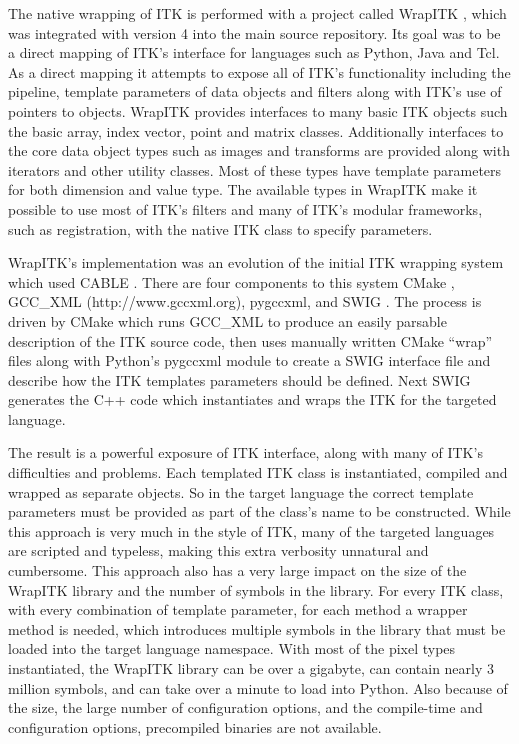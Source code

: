 \documentclass{frontiersMED} %
\begin{document}
The native wrapping of ITK is performed with a project called WrapITK
\cite{Lehmann2006}, which was integrated with version 4 into the main source
repository. Its goal was to be a direct mapping of ITK's interface for
languages such as Python, Java and Tcl. As a direct mapping it
attempts to expose all of ITK's functionality including the pipeline,
template parameters of data objects and filters along with ITK's use
of pointers to objects. WrapITK provides interfaces to many basic ITK
objects such the basic array, index vector, point and matrix
classes. Additionally interfaces to the core data object types such as
images and transforms are provided along with iterators and other
utility classes. Most of these types have template parameters for both
dimension and value type. The available types in WrapITK make it
possible to use most of ITK's filters and many of ITK's modular
frameworks, such as registration, with the native ITK class to specify
parameters.

WrapITK's implementation was an evolution of the initial ITK wrapping
system which used CABLE \cite{Lehmann2006}. There are four components to
this system CMake \cite{Martin2003}, GCC\_XML (http://www.gccxml.org), pygccxml, and SWIG
\cite{Beazley2003}. The process is driven by CMake which runs GCC\_XML to
produce an easily parsable description of the ITK source code, then
uses manually written CMake ``wrap'' files along with Python's pygccxml
module to create a SWIG interface file and describe how the ITK
templates parameters should be defined. Next SWIG generates the C++
code which instantiates and wraps the ITK for the targeted language.

The result is a powerful exposure of ITK interface, along with many of
ITK's difficulties and problems. Each templated ITK class is
instantiated, compiled and wrapped as separate objects. So in the
target language the correct template parameters must be provided as
part of the class's name to be constructed. While this approach is
very much in the style of ITK, many of the targeted languages are
scripted and typeless, making this extra verbosity unnatural and
cumbersome.  This approach also has a very large impact on the size of
the WrapITK library and the number of symbols in the library. For
every ITK class, with every combination of template parameter, for
each method a wrapper method is needed, which introduces multiple
symbols in the library that must be loaded into the target language
namespace. With most of the pixel types instantiated, the WrapITK
library can be over a gigabyte, can contain nearly 3 million symbols,
and can take over a minute to load into Python. Also because of the size,
the large number of configuration options, and the compile-time and
configuration options, precompiled binaries are not available.
\end{document}
